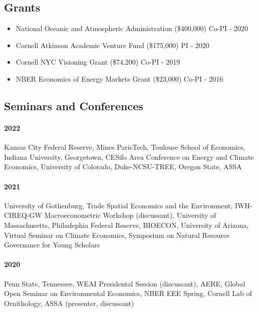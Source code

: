 \documentclass[12pt]{res} %
\begin{document}
\begin{resume}
\vspace{-.2in}

\subsection{Grants}
\begin{itemize}  \itemsep -1pt
	\item[] National Oceanic and Atmospheric Administration (\$400,000) \hfill Co-PI - 2020
	\item[] Cornell Atkinson Academic Venture Fund (\$175,000) \hfill PI - 2020
	\item[] Cornell NYC Visioning Grant (\$74,200) \hfill Co-PI - 2019
	\item[] NBER Economics of Energy Markets Grant (\$23,000) \hfill Co-PI - 2016
\end{itemize}

\vspace{-.2in}

\subsection{Seminars and Conferences}\vspace{-.1in}
\paragraph{2022} Kansas City Federal Reserve, Mines ParisTech, Toulouse School of Economics, Indiana University, Georgetown, CESifo Area Conference on Energy and Climate Economics, University of Colorado, Duke-NCSU-TREE, Oregon State, ASSA \vspace{-.2in}
\paragraph{2021} University of Gothenburg, Trade Spatial Economics and the Environment, IWH-CIREQ-GW Macroeconometric Workshop (discussant), University of Massachusetts, Philadephia Federal Reserve, BIOECON, University of Arizona, Virtual Seminar on Climate Economics, Symposium on Natural Resource Governance for Young Scholars \vspace{-.2in}
\paragraph{2020} Penn State, Tennessee, WEAI Presidental Session (discussant), AERE, Global Open Seminar on Environmental Economics, NBER EEE Spring, Cornell Lab of Ornithology, ASSA (presenter, discussant) \vspace{-.2in}

\end{resume}
\end{document}
